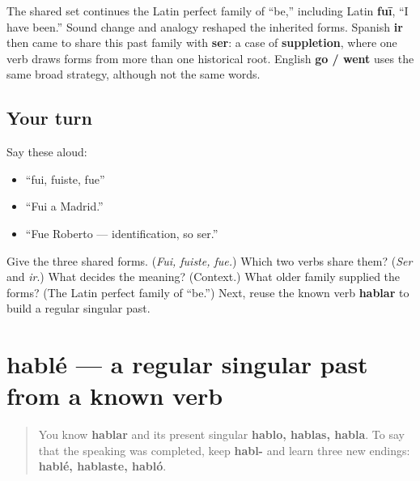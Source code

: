 \begin{cousinweb}
The shared set continues the Latin perfect family of “be,” including Latin \textbf{fuī}, “I have been.” Sound change and analogy reshaped the inherited forms. Spanish \textbf{ir} then came to share this past family with \textbf{ser}: a case of \textbf{suppletion}, where one verb draws forms from more than one historical root. English \textbf{go / went} uses the same broad strategy, although not the same words.
\end{cousinweb}

\subsection*{Your turn}
Say these aloud:

\begin{itemize}
\raggedright
  \item “fui, fuiste, fue”
  \item “Fui a Madrid.”
  \item “Fue Roberto — identification, so ser.”
\end{itemize}

\begin{tcolorbox}[breakable,colback=teal!4,colframe=teal!35!black,title={Before you move on}]
Give the three shared forms. (\emph{Fui, fuiste, fue.}) Which two verbs share them? (\emph{Ser} and \emph{ir}.) What decides the meaning? (Context.) What older family supplied the forms? (The Latin perfect family of “be.”) Next, reuse the known verb \textbf{hablar} to build a regular singular past.
\end{tcolorbox}
\section[hablé]{hablé — a regular singular past from a known verb}

\label{lesson:ES-C14-hablar-preterite}



\begin{quote}
You know \textbf{hablar} and its present singular \textbf{hablo, hablas, habla}. To say that the speaking was completed, keep \textbf{habl-} and learn three new endings: \textbf{hablé, hablaste, habló}.
\end{quote}

